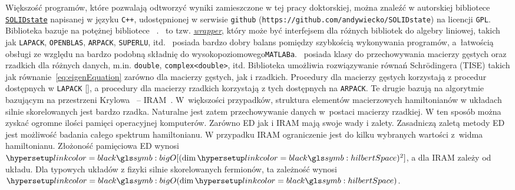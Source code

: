 Większość programów, które pozwalają odtworzyć wyniki zamieszczone w tej pracy doktorskiej, można znaleźć w autorskiej bibliotece \href{https://github.com/andywiecko/SOLIDstate}{\texttt{\normalsize SOLIDstate}} napisanej w języku \texttt{\normalsize C++}, udostępnionej w serwisie \texttt{\normalsize github} (\texttt{\small https://github.com/andywiecko/SOLIDstate}) na licencji \texttt{\normalsize GPL}.
Biblioteka bazuje na potężnej bibliotece \href{http://arma.sourceforge.net/}{\arma}~\cite{sanderson.curtin.2016,sanderson.curtin.2019}.
\arma\ to tzw. \href{https://en.wikipedia.org/wiki/Wrapper_library}{\textit{wrapper}}, który może być interfejsem dla różnych bibliotek do algebry liniowej, takich jak \texttt{\normalsize LAPACK}, \texttt{\normalsize OPENBLAS}, \texttt{\normalsize ARPACK}, \texttt{\normalsize SUPERLU}, itd. %
\arma\ posiada bardzo dobry balans pomiędzy szybkością wykonywania programów, a~łatwością obsługi ze względu na bardzo podobną składnię do wysokopoziomowego\linebreak \texttt{\normalsize MATLABa}.
\arma\ posiada klasy do przechowywania macierzy gęstych oraz rzadkich dla różnych danych, m.in. \texttt{\normalsize double}, \texttt{\normalsize complex<double>}, itd.
Biblioteka umożliwia rozwiązywanie równań Schr\"odingera (\acrshort{TISE}) takich jak równanie~\eqref{eq:eigenEquation} zarówno dla macierzy gęstych, jak i rzadkich.
Procedury dla macierzy gęstych korzystają z procedur dostępnych w \texttt{\normalsize LAPACK} [], a procedury dla macierzy rzadkich korzystają z tych dostępnych na \texttt{\normalsize ARPACK}.
Te drugie bazują na algorytmie bazującym na przestrzeni Krylowa~\cite{krylov.1931} -- \acrfull{IRAM}~\cite{lehoucq.sorosen.1996}.
W~większości przypadków, struktura elementów macierzowych hamiltonianów w układach silnie skorelowanych jest bardzo rzadka.
Naturalne jest zatem przechowywanie danych w~postaci macierzy rzadkiej. 
W ten sposób można zyskać ogromne ilości pamięci operacyjnej komputerów.
Zarówno \acrshort{ED} jak i \acrshort{IRAM} mają swoje wady i zalety.
Zasadniczą zaletą metody \acrshort{ED} jest możliwość badania całego spektrum hamiltonianu.
W przypadku \acrshort{IRAM} ograniczenie jest do kilku wybranych wartości z~widma hamiltonianu.
Złożoność pamięciowa \acrshort{ED} wynosi $\bigO[(\dim\hilbertSpace)^2]$, a dla \acrshort{IRAM} zależy od układu. 
Dla typowych układów z fizyki silnie skorelowanych fermionów, ta zależność wynosi $\bigO(\dim\hilbertSpace)$.

\ornament